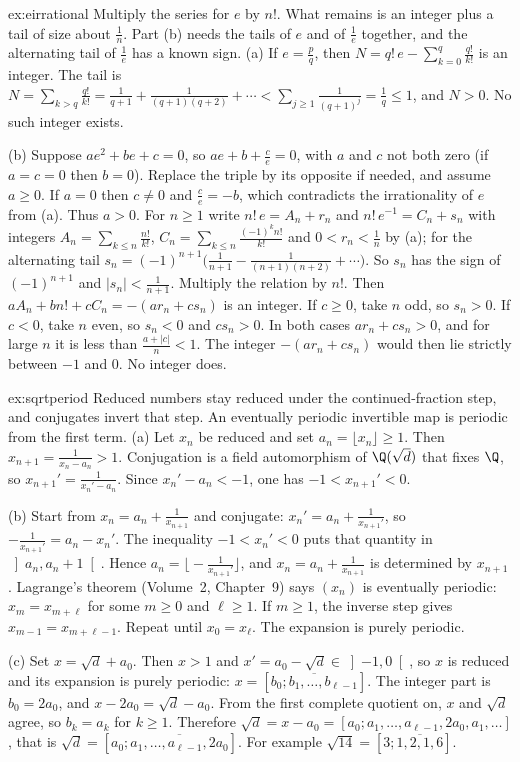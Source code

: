 \begin{solution}{ex:eirrational}
\idea Multiply the series for $e$ by $n!$. What remains is an integer plus a tail of size about $\frac1n$. Part (b) needs the tails of $e$ and of $\frac1e$ together, and the alternating tail of $\frac1e$ has a known sign.
\writeup (a) If $e=\frac pq$, then $N=q!\,e-\sum_{k=0}^q\frac{q!}{k!}$ is an integer. The tail is $N=\sum_{k>q}\frac{q!}{k!}=\frac1{q+1}+\frac1{(q+1)(q+2)}+\cdots<\sum_{j\ge1}\frac1{(q+1)^j}=\frac1q\le1$, and $N>0$. No such integer exists.

(b) Suppose $ae^2+be+c=0$, so $ae+b+\frac ce=0$, with $a$ and $c$ not both zero (if $a=c=0$ then $b=0$). Replace the triple by its opposite if needed, and assume $a\ge0$. If $a=0$ then $c\ne0$ and $\frac ce=-b$, which contradicts the irrationality of $e$ from (a). Thus $a>0$. For
$n\ge1$ write $n!\,e=A_n+r_n$ and $n!\,e^{-1}=C_n+s_n$ with integers $A_n=\sum_{k\le n}\frac{n!}{k!}$,
$C_n=\sum_{k\le n}\frac{(-1)^kn!}{k!}$ and $0<r_n<\frac1n$ by (a); for the alternating tail
$s_n=(-1)^{n+1}\bigl(\frac1{n+1}-\frac1{(n+1)(n+2)}+\cdots\bigr)$. So $s_n$ has the sign of $(-1)^{n+1}$ and $|s_n|<\frac1{n+1}$. Multiply the relation by $n!$. Then $aA_n+bn!+cC_n=-(ar_n+cs_n)$ is an integer. If $c\ge0$, take $n$ odd, so $s_n>0$. If $c<0$, take $n$ even, so $s_n<0$ and $cs_n>0$. In both cases $ar_n+cs_n>0$, and for large $n$ it is less than $\frac{a+|c|}n<1$. The integer $-(ar_n+cs_n)$ would then lie strictly between $-1$ and $0$. No integer does.
\end{solution}

\begin{solution}{ex:sqrtperiod}
\idea Reduced numbers stay reduced under the continued-fraction step, and conjugates invert that step. An eventually periodic invertible map is periodic from the first term.
\writeup (a) Let $x_n$ be reduced and set $a_n=\lfloor x_n\rfloor\ge1$. Then $x_{n+1}=\frac1{x_n-a_n}>1$. Conjugation is a field automorphism of $\Q(\sqrt d)$ that fixes $\Q$, so $x_{n+1}'=\frac1{x_n'-a_n}$. Since $x_n'-a_n<-1$, one has $-1<x_{n+1}'<0$.

(b) Start from $x_n=a_n+\frac1{x_{n+1}}$ and conjugate: $x_n'=a_n+\frac1{x_{n+1}'}$, so $-\frac1{x_{n+1}'}=a_n-x_n'$. The inequality $-1<x_n'<0$ puts that quantity in $\left]a_n,a_n+1\right[$. Hence $a_n=\bigl\lfloor-\frac1{x_{n+1}'}\bigr\rfloor$, and $x_n=a_n+\frac1{x_{n+1}}$ is determined by $x_{n+1}$. Lagrange's theorem (Volume~2, Chapter~9) says $(x_n)$ is eventually periodic: $x_m=x_{m+\ell}$ for some $m\ge0$ and $\ell\ge1$. If $m\ge1$, the inverse step gives $x_{m-1}=x_{m+\ell-1}$. Repeat until $x_0=x_\ell$. The expansion is purely periodic.

(c) Set $x=\sqrt d+a_0$. Then $x>1$ and $x'=a_0-\sqrt d\in\left]-1,0\right[$, so $x$ is reduced and its expansion is purely periodic: $x=[\overline{b_0;b_1,\dots,b_{\ell-1}}]$. The integer part is $b_0=2a_0$, and $x-2a_0=\sqrt d-a_0$. From the first complete quotient on, $x$ and $\sqrt d$ agree, so $b_k=a_k$ for $k\ge1$. Therefore $\sqrt d=x-a_0=[a_0;a_1,\dots,a_{\ell-1},2a_0,a_1,\dots]$, that is $\sqrt d=[a_0;\overline{a_1,\dots,a_{\ell-1},2a_0}]$. For example $\sqrt{14}=[3;\overline{1,2,1,6}]$.
\end{solution}

